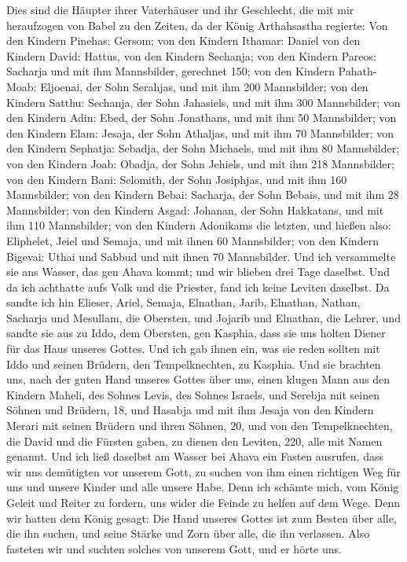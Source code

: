  Dies sind die Häupter ihrer Vaterhäuser und ihr
Geschlecht, die mit mir heraufzogen von Babel zu den Zeiten, da der
König Arthahsastha regierte:  Von den Kindern Pinehas:
Gersom; von den Kindern Ithamar: Daniel von den Kindern David: Hattus,
 von den Kindern Sechanja; von den Kindern Pareos:
Sacharja und mit ihm Mannsbilder, gerechnet 150;  von den
Kindern Pahath-Moab: Eljoenai, der Sohn Serahjas, und mit ihm 200
Mannsbilder;  von den Kindern Satthu: Sechanja, der Sohn
Jahasiels, und mit ihm 300 Mannsbilder;  von den Kindern
Adin: Ebed, der Sohn Jonathans, und mit ihm 50 Mannsbilder;
 von den Kindern Elam: Jesaja, der Sohn Athaljas, und mit
ihm 70 Mannsbilder;  von den Kindern Sephatja: Sebadja,
der Sohn Michaels, und mit ihm 80 Mannsbilder;  von den
Kindern Joab: Obadja, der Sohn Jehiels, und mit ihm 218 Mannsbilder;
 von den Kindern Bani: Selomith, der Sohn Josiphjas, und
mit ihm 160 Mannsbilder;  von den Kindern Bebai:
Sacharja, der Sohn Bebais, und mit ihm 28 Mannsbilder; 
von den Kindern Asgad: Johanan, der Sohn Hakkatans, und mit ihm 110
Mannsbilder;  von den Kindern Adonikams die letzten, und
hießen also: Eliphelet, Jeiel und Semaja, und mit ihnen 60 Mannsbilder;
 von den Kindern Bigevai: Uthai und Sabbud und mit ihnen
70 Mannsbilder.  Und ich versammelte sie ans Wasser, das
gen Ahava kommt; und wir blieben drei Tage daselbst. Und da ich
achthatte aufs Volk und die Priester, fand ich keine Leviten daselbst.
 Da sandte ich hin Elieser, Ariel, Semaja, Elnathan,
Jarib, Elnathan, Nathan, Sacharja und Mesullam, die Obersten, und
Jojarib und Elnathan, die Lehrer,  und sandte sie aus zu
Iddo, dem Obersten, gen Kasphia, dass sie uns holten Diener für das Haus
unseres Gottes. Und ich gab ihnen ein, was sie reden sollten mit Iddo
und seinen Brüdern, den Tempelknechten, zu Kasphia.  Und
sie brachten uns, nach der guten Hand unseres Gottes über uns, einen
klugen Mann aus den Kindern Maheli, des Sohnes Levis, des Sohnes
Israels, und Serebja mit seinen Söhnen und Brüdern, 18, 
und Hasabja und mit ihm Jesaja von den Kindern Merari mit seinen Brüdern
und ihren Söhnen, 20,  und von den Tempelknechten, die
David und die Fürsten gaben, zu dienen den Leviten, 220, alle mit Namen
genannt.  Und ich ließ daselbst am Wasser bei Ahava ein
Fasten ausrufen, dass wir uns demütigten vor unserem Gott, zu suchen von
ihm einen richtigen Weg für uns und unsere Kinder und alle unsere Habe.
 Denn ich schämte mich, vom König Geleit und Reiter zu
fordern, uns wider die Feinde zu helfen auf dem Wege. Denn wir hatten
dem König gesagt: Die Hand unseres Gottes ist zum Besten über alle, die
ihn suchen, und seine Stärke und Zorn über alle, die ihn verlassen.
 Also fasteten wir und suchten solches von unserem Gott,
und er hörte uns.

